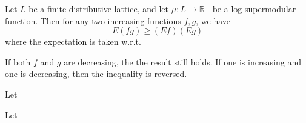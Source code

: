 \begin{theorem}
    Let $L$ be a finite distributive lattice, and let $\mu:L\to \mathbb{R}^+$ be a log-supermodular function.
    Then for any two increasing functions $f,g$, we have
    \[E(fg)\ge (Ef) (Eg)\] where the expectation is taken w.r.t. 
\end{theorem}
\begin{remark}
    If both $f$ and $g$ are decreasing, the the result still holds. If one is increasing and one is decreasing, then the inequality is reversed.
\end{remark}

\begin{lemma}
    Let 
\end{lemma}

\begin{theorem}
    
\end{theorem}

\begin{definition}
    
\end{definition}

\begin{theorem}
    Let 
\end{theorem}


